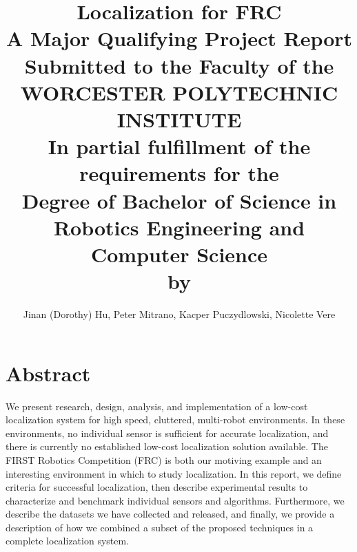\documentclass{article}
\begin{document}
\thispagestyle{empty}
\title{
\huge{\textbf{Localization for FRC}} \\
\vspace{1.0cm}
\small{A Major Qualifying Project Report} \\
\vspace{0.7cm}
\small{Submitted to the Faculty of the} \\
\vspace{0.7cm}
\large{WORCESTER POLYTECHNIC INSTITUTE} \\
\vspace{0.7cm}
\small{In partial fulfillment of the requirements for the} \\
\vspace{0.7cm}
Degree of Bachelor of Science in \\
\vspace{0.7cm}
\large{Robotics Engineering and Computer Science} \\
\vspace{0.7cm}
\small{by}}
\author{Jinan (Dorothy) Hu, Peter Mitrano, Kacper Puczydlowski, Nicolette Vere}

\maketitle{}

\newpage


\section*{Abstract}


  We present research, design, analysis, and implementation of a low-cost localization system for high speed, cluttered, multi-robot environments. In these environments, no individual sensor is sufficient for accurate localization, and there is currently no established low-cost localization solution available. The FIRST Robotics Competition (FRC) is both our motiving example and an interesting environment in which to study localization. In this report, we define criteria for successful localization, then describe experimental results to characterize and benchmark individual sensors and algorithms. Furthermore, we describe the datasets we have collected and released, and finally, we provide a description of how we combined a subset of the proposed techniques in a complete localization system.
\end{document}
